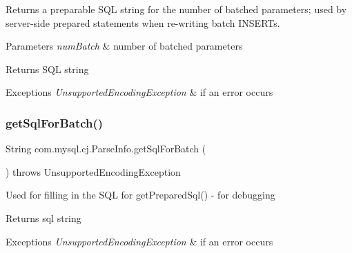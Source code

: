 Returns a preparable S\+QL string for the number of batched parameters; used by server-\/side prepared statements when re-\/writing batch I\+N\+S\+E\+R\+Ts.


\begin{DoxyParams}{Parameters}
{\em num\+Batch} & number of batched parameters \\
\hline
\end{DoxyParams}
\begin{DoxyReturn}{Returns}
S\+QL string 
\end{DoxyReturn}

\begin{DoxyExceptions}{Exceptions}
{\em Unsupported\+Encoding\+Exception} & if an error occurs \\
\hline
\end{DoxyExceptions}
\mbox{\label{classcom_1_1mysql_1_1cj_1_1_parse_info_a49a364ef5d8d3f1ac2ea98576601a926}} 
\subsubsection{\texorpdfstring{get\+Sql\+For\+Batch()}{getSqlForBatch()}\hspace{0.1cm}{\footnotesize\ttfamily [2/2]}}
{\footnotesize\ttfamily String com.\+mysql.\+cj.\+Parse\+Info.\+get\+Sql\+For\+Batch (\begin{DoxyParamCaption}{ }\end{DoxyParamCaption}) throws Unsupported\+Encoding\+Exception}

Used for filling in the S\+QL for get\+Prepared\+Sql() -\/ for debugging

\begin{DoxyReturn}{Returns}
sql string 
\end{DoxyReturn}

\begin{DoxyExceptions}{Exceptions}
{\em Unsupported\+Encoding\+Exception} & if an error occurs \\
\hline
\end{DoxyExceptions}
\mbox{\label{classcom_1_1mysql_1_1cj_1_1_parse_info_a7bcdc3fc9f3ba6ee10cbebd852ec7499}} 
